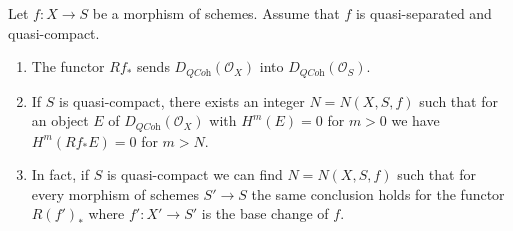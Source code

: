 \begin{lemma}
\label{lemma-quasi-coherence-direct-image}
Let $f : X \to S$ be a morphism of schemes.
Assume that $f$ is quasi-separated and quasi-compact.
\begin{enumerate}
\item The functor $Rf_*$ sends $D_{\textit{QCoh}}(\mathcal{O}_X)$
into $D_{\textit{QCoh}}(\mathcal{O}_S)$.
\item If $S$ is quasi-compact, there exists an integer $N = N(X, S, f)$
such that for an object $E$ of $D_{\textit{QCoh}}(\mathcal{O}_X)$
with $H^m(E) = 0$ for $m > 0$ we have
$H^m(Rf_*E) = 0$ for $m > N$.
\item In fact, if $S$ is quasi-compact we can find $N = N(X, S, f)$
such that for every morphism of schemes $S' \to S$
the same conclusion holds for the functor $R(f')_*$
where $f' : X' \to S'$ is the base change of $f$.
\end{enumerate}
\end{lemma}

